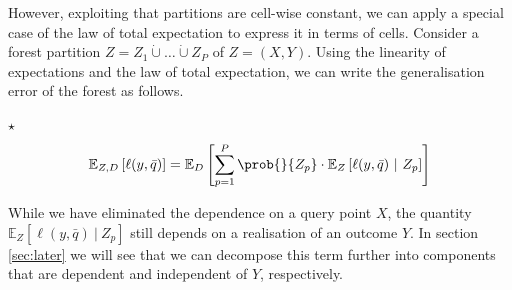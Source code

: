 \documentclass[../main.tex]{subfiles}
\begin{document}
However, exploiting that partitions are cell-wise constant, we can apply a special case of the law of total expectation to express it in terms of cells.
Consider a forest partition $Z = Z_{1} \dot\cup \dots \dot\cup Z_{P}$ of $Z=(X,Y)$. Using the linearity of expectations and the law of total expectation, we can write the generalisation error of the forest as follows. 
\begin{proposition} $\star$
$$
\mathbb{E}_{Z,D}\left[ \ell(y,\bar{q}) \right] = \mathbb{E}_{D}\left[ \sum_{p=1}^P \prob{}{Z_{p}} \cdot \mathbb{E}_{Z}\left[ \ell(y, \bar{q}) ~|~Z_{p}\right]   \right] 
$$
\end{proposition}
While we have eliminated the dependence on a query point $X$, the quantity $\mathbb{E}_{Z}\left[ \ell(y, \bar{q}) ~|~Z_{p}\right]$ still depends on a realisation of an outcome $Y$. In section \ref{sec:later} we will see that we can decompose this term further into components that are dependent and independent of $Y$, respectively.
\end{document}
